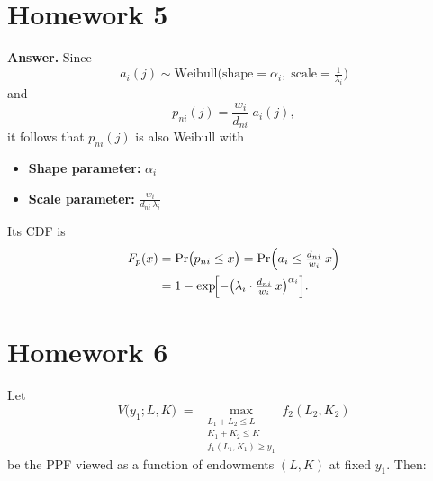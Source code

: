 \documentclass[
]{article}
\providecommand{\tightlist}{%
  \setlength{\itemsep}{0pt}\setlength{\parskip}{0pt}}
\begin{document}
\section{Homework 5}\label{homework-5}

\textbf{Answer.} Since \[
a_i(j)\sim\mathrm{Weibull}\bigl(\text{shape}=\alpha_i,\;\text{scale}=\tfrac1{\lambda_i}\bigr)
\] and \[
p_{ni}(j)=\frac{w_i}{d_{ni}}\;a_i(j),
\] it follows that \(p_{ni}(j)\) is also Weibull with

\begin{itemize}
\tightlist
\item
  \textbf{Shape parameter:} \(\alpha_i\)\\
\item
  \textbf{Scale parameter:}
  \(\displaystyle \frac{w_i}{d_{ni}\,\lambda_i}\)
\end{itemize}

Its CDF is \[
\begin{aligned}
F_{p}(x)
&= \Pr\bigl(p_{ni}\le x\bigr)
= \Pr\Bigl(a_i \le \tfrac{d_{ni}}{w_i}\,x\Bigr)\\
&=1-\exp\!\Bigl[-\bigl(\lambda_i\cdot\tfrac{d_{ni}}{w_i}\,x\bigr)^{\alpha_i}\Bigr].
\end{aligned}
\]

\section{Homework 6}\label{homework-6}

Let\\
\[
V\bigl(y_{1};L,K\bigr)
\;=\;
\max_{\substack{L_{1}+L_{2}\le L\\K_{1}+K_{2}\le K\\f_{1}(L_{1},K_{1})\ge y_{1}}}
f_{2}(L_{2},K_{2})
\] be the PPF viewed as a function of endowments \((L,K)\) at fixed
\(y_{1}\). Then:
\end{document}
